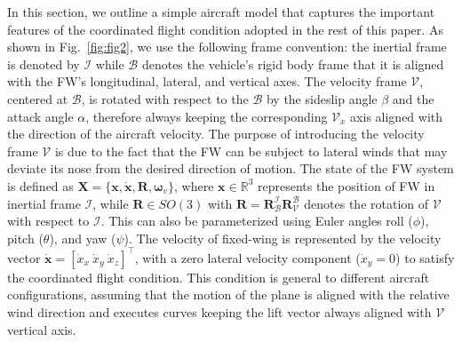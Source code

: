 In this section, we outline a simple aircraft model that captures the important features of the coordinated flight condition adopted in the rest of this paper.
As shown in Fig.~\ref{fig:fig2}, we use the following frame convention: the inertial frame is denoted by $\mathcal{I}$ while $\mathcal{B}$ denotes the vehicle’s rigid body frame that it is aligned with the FW's longitudinal, lateral, and vertical axes. The velocity frame $\mathcal{V}$, centered at $\mathcal{B}$, is rotated with respect to the $\mathcal{B}$ by the sideslip angle $\beta$ and the attack angle $\alpha$, therefore always keeping the corresponding $\mathcal{V}_x$ axis aligned with the direction of the aircraft velocity. The purpose of introducing the velocity frame $\mathcal{V}$ is due to the fact that the FW can be subject to lateral winds that may deviate its nose from the desired direction of motion. 
The state of the FW system is defined as $\mathbf{X} = \{\mathbf{x}, \mathbf{\dot{x}}, \mathbf{R}, \bm{\omega}_v\}$, where $\mathbf{x} \in \mathbb{R}^3$ represents the position of FW in inertial frame $\mathcal{I}$,  
while $\mathbf{R} \in SO(3)$ with $\mathbf{R}= \mathbf{R}_{\mathcal{B}}^{\mathcal{I}}\mathbf{R}_{\mathcal{V}}^{\mathcal{B}}$ denotes the rotation of $\mathcal{V}$ with respect to $\mathcal{I}$. This can also be parameterized using Euler angles roll ($\phi$), pitch ($\theta$), and yaw ($\psi$). The velocity of fixed-wing is represented by the velocity vector $\mathbf{\dot{x}} = [\dot{x}_{x}~\dot{x}_{y}~\dot{x}_{z}]^\top$, with a zero lateral velocity component ($\dot{x}_{y} = 0$) to satisfy the coordinated flight condition. This condition is general to different aircraft configurations, assuming that the motion of the plane is aligned with the relative wind direction and executes curves keeping the lift vector always aligned with $\mathcal{V}$ vertical axis. 



